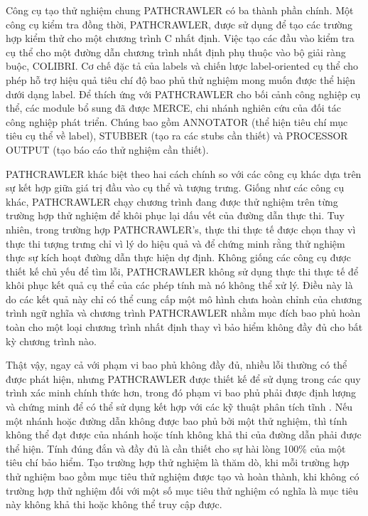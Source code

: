 \documentclass[12pt,a4paper]{article}
\begin{document}
Công cụ tạo thử nghiệm chung PATHCRAWLER có ba thành phần chính. Một công cụ kiểm tra đồng thời, PATHCRAWLER, được sử dụng để tạo các trường hợp kiểm thử cho một chương trình C nhất định. Việc tạo các đầu vào kiểm tra cụ thể cho một đường dẫn chương trình nhất định phụ thuộc vào bộ giải ràng buộc, COLIBRI. Cơ chế đặc tả của labels và chiến lược label-oriented cụ thể cho phép hỗ trợ hiệu quả tiêu chí độ bao phủ thử nghiệm mong muốn được thể hiện dưới dạng label. Để thích ứng với PATHCRAWLER cho bối cảnh công nghiệp cụ thể, các module bổ sung đã được MERCE, chi nhánh nghiên cứu của đối tác công nghiệp phát triển. Chúng bao gồm ANNOTATOR (thể hiện tiêu chí mục tiêu cụ thể về label), STUBBER (tạo ra các stubs cần thiết) và PROCESSOR OUTPUT (tạo báo cáo thử nghiệm cần thiết).

\indent PATHCRAWLER khác biệt theo hai cách chính so với các công cụ khác dựa trên sự kết hợp giữa giá trị đầu vào cụ thể và tượng trưng. Giống như các công cụ khác, PATHCRAWLER chạy chương trình đang được thử nghiệm trên từng trường hợp thử nghiệm để khôi phục lại dấu vết của đường dẫn thực thi. Tuy nhiên, trong trường hợp PATHCRAWLER's, thực thi thực tế được chọn thay vì thực thi tượng trưng chỉ vì lý do hiệu quả và để chứng minh rằng thử nghiệm thực sự kích hoạt đường dẫn thực hiện dự định. Không giống các công cụ được thiết kế chủ yếu để tìm lỗi, PATHCRAWLER không sử dụng thực thi thực tế để khôi phục kết quả cụ thể của các phép tính mà nó không thể xử lý. Điều này là do các kết quả này chỉ có thể cung cấp một mô hình chưa hoàn chỉnh của chương trình ngữ nghĩa và chương trình PATHCRAWLER nhằm mục đích bao phủ hoàn toàn cho một loại chương trình nhất định thay vì bảo hiểm không đầy đủ cho bất kỳ chương trình nào.

\indent Thật vậy, ngay cả với phạm vi bao phủ không đầy đủ, nhiều lỗi thường có thể được phát hiện, nhưng PATHCRAWLER được thiết kế để sử dụng trong các quy trình xác minh chính thức hơn, trong đó phạm vi bao phủ phải được định lượng và chứng minh để có thể sử dụng kết hợp với các kỹ thuật phân tích tĩnh \cite{petiot2014test}. Nếu một nhánh hoặc đường dẫn không được bao phủ bởi một thử nghiệm, thì tính không thể đạt được của nhánh hoặc tính không khả thi của đường dẫn phải được thể hiện. Tính đúng đắn và đầy đủ là cần thiết cho sự hài lòng 100\% của một tiêu chí bảo hiểm. Tạo trường hợp thử nghiệm là thăm dò, khi mỗi trường hợp thử nghiệm bao gồm mục tiêu thử nghiệm được tạo và hoàn thành, khi không có trường hợp thử nghiệm đối với một số mục tiêu thử nghiệm có nghĩa là mục tiêu này không khả thi hoặc không thể truy cập được.
\end{document}
